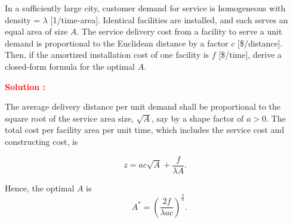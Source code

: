 \documentclass[12pt]{article}
\begin{document}
In a sufficiently large city, customer demand for service is homogeneous with density = $\lambda$ [1/time-area]. Identical facilities are installed, and each serves an equal area of size $A$. The service delivery cost from a facility to serve a unit demand is proportional to the Euclidean distance by a factor $c$ [\$/distance]. Then, if the amortized installation cost of one facility is $f$ [\$/time], derive a closed-form formula for the optimal $A$.


\textbf{\textcolor{red}{Solution :}} 

The average delivery distance per unit demand shall be proportional to the square root of the service area size, $\sqrt{A}$, say by a shape factor of $a>0$.
The total cost per facility area per unit time, which includes the service cost and constructing cost, is

\[
z = a c \sqrt{A} + \frac{f}{\lambda A}.
\]

Hence, the optimal $A$ is
\[
\quad A^\ast = \left( \frac{2f}{\lambda ac} \right)^{\frac{2}{3}}.
\]
\newpage
\end{document}
